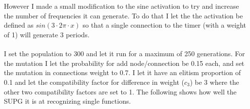 \documentclass[11pt, a4paper]{article}
\begin{document}
\\
\\
However I made a small modification to the sine activation to try and increase the number of frequencies it can generate. To do that I let the the activation be defined as $ sin(3 \cdot2\pi \cdot x) $ so that a single connection to the timer (with a weight of 1) will generate 3 periods.
\\
\\
I set the population to 300 and let it run for a maximum of 250 generations. For the mutation I let the probability for add node/connection be 0.15 each, and set the mutation in connections weight to 0.7. I let it have an elitism proportion of 0.1 and let the compatibility factor for difference in weight ($ c_3 $) be 3 where the other two compatibility factors are set to 1. The following shows how well the SUPG it is at recognizing single functions.
\end{document}
